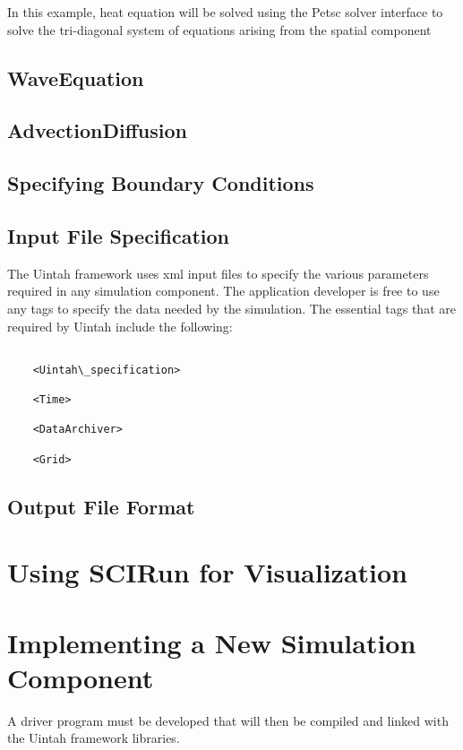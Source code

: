 \documentclass[12pt]{report}
\begin{document}
In this example, heat equation will be solved using the Petsc solver
interface to solve the tri-diagonal system of equations arising from
the spatial component

\section{WaveEquation}

\section{AdvectionDiffusion}

\section{Specifying Boundary Conditions}

\section{Input File Specification}

The Uintah framework uses xml input files to specify the various
parameters required in any simulation component.  The application
developer is free to use any tags to specify the data needed by the
simulation.  The essential tags that are required by Uintah include
the following:

\begin{verbatim}

	<Uintah\_specification>

	<Time>

	<DataArchiver>

	<Grid>

\end{verbatim}

\section{Output File Format}


\chapter{Using SCIRun for Visualization}


\chapter{Implementing a New Simulation Component}

A driver program must be developed that will then be compiled and
linked with the Uintah framework libraries.
\end{document}
